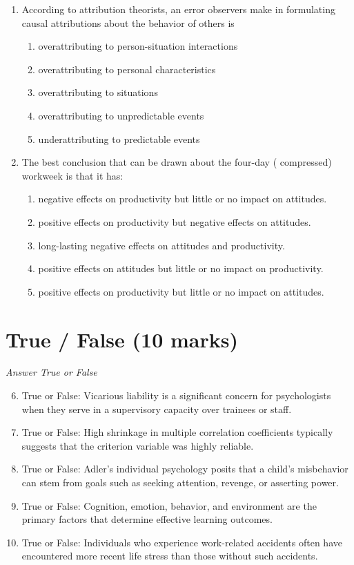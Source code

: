 \documentclass[12pt]{article}
\begin{document}
\begin{enumerate}[label=\arabic*.]
\begin{enumerate}[label=(\alph*)]
    \item Emotional intelligence
\end{enumerate}
\item According to attribution theorists, an error observers make in formulating causal attributions about the behavior of others is
\begin{enumerate}[label=(\alph*)]
    \item overattributing to person-situation interactions
    \item overattributing to personal characteristics
    \item overattributing to situations
    \item overattributing to unpredictable events
    \item underattributing to predictable events
\end{enumerate}
\item The best conclusion that can be drawn about the four-day ( compressed) workweek is that it has:
\begin{enumerate}[label=(\alph*)]
    \item negative effects on productivity but little or no impact on attitudes.
    \item positive effects on productivity but negative effects on attitudes.
    \item long-lasting negative effects on attitudes and productivity.
    \item positive effects on attitudes but little or no impact on productivity.
    \item positive effects on productivity but little or no impact on attitudes.
\end{enumerate}
\end{enumerate}

\section*{True / False (10 marks)}
\textit{Answer True or False}
\begin{enumerate}[label=\arabic*.]
\setcounter{enumi}{5}
\item True or False: Vicarious liability is a significant concern for psychologists when they serve in a supervisory capacity over trainees or staff.
\item True or False: High shrinkage in multiple correlation coefficients typically suggests that the criterion variable was highly reliable.
\item True or False: Adler's individual psychology posits that a child's misbehavior can stem from goals such as seeking attention, revenge, or asserting power.
\item True or False: Cognition, emotion, behavior, and environment are the primary factors that determine effective learning outcomes.
\item True or False: Individuals who experience work-related accidents often have encountered more recent life stress than those without such accidents.
\end{enumerate}
\end{document}
